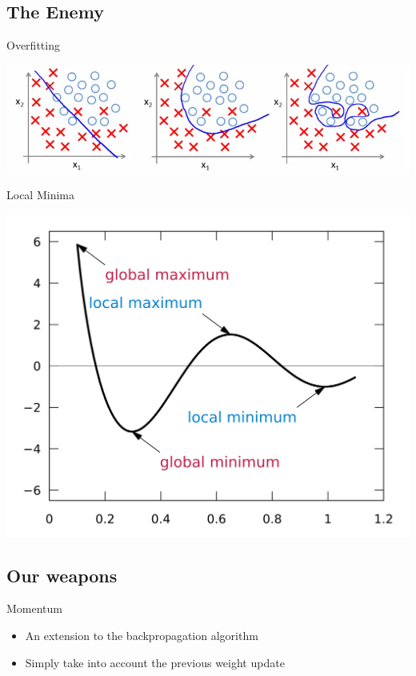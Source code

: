 \subsection{The Enemy}

\begin{frame}[c]{Overfitting}
  \begin{center}
    \includegraphics[scale=0.6]{./pictures/overfitting.png}
  \end{center}
\end{frame}

\begin{frame}[c]{Local Minima}
  \begin{center}
    \includegraphics[scale=0.095]{./pictures/local_minima.png}
  \end{center}
\end{frame}

\subsection{Our weapons}

\begin{frame}[c]{Momentum}
  \begin{itemize}
    \item An extension to the backpropagation algorithm
    \item Simply take into account the previous weight update
  \end{itemize}
\end{frame}


